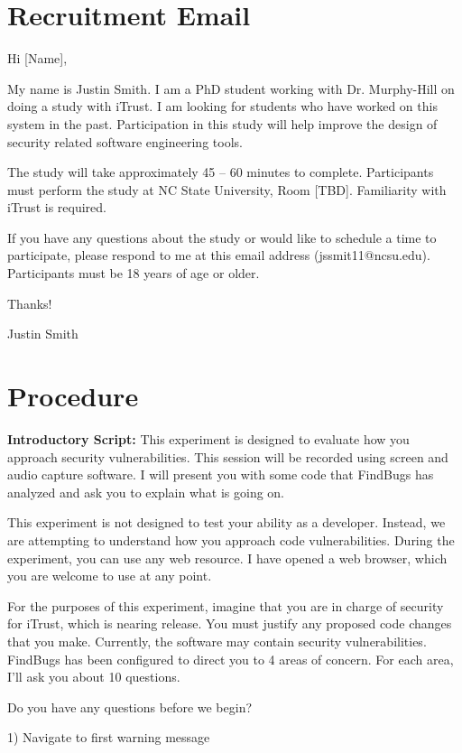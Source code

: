 \documentclass[10pt,journal,compsoc]{IEEEtran}
\begin{document}
\appendices
\section{Recruitment Email}
Hi [Name],

My name is Justin Smith. I am a PhD student working with Dr. Murphy-Hill on doing a study with iTrust.
I am looking for students who have worked on this system in the past. Participation in this study will help
improve the design of security related software engineering tools.

The study will take approximately 45 -- 60 minutes to complete. Participants must perform the study at
NC State University, Room [TBD]. Familiarity with iTrust is required.

If you have any questions about the study or would like to schedule a time to participate, please respond
to me at this email address (jssmit11@ncsu.edu).
Participants must be 18 years of age or older.

\noindent Thanks!

\noindent Justin Smith 

\section{Procedure}

\textbf{Introductory Script:} This experiment is designed to evaluate how you approach security vulnerabilities. This session
will be recorded using screen and audio capture software. I will present you with some code that
FindBugs has analyzed and ask you to explain what is going on.

This experiment is not designed to test your ability as a developer. Instead, we are attempting to
understand how you approach code vulnerabilities. During the experiment, you can use any web
resource. I have opened a web browser, which you are welcome to use at any point.

For the purposes of this experiment, imagine that you are in charge of security for iTrust, which
is nearing release. You must justify any proposed code changes that you make. Currently, the
software may contain security vulnerabilities. FindBugs has been configured to direct you to 4
areas of concern. For each area, I’ll ask you about 10 questions.

Do you have any questions before we begin?

1) Navigate to first warning message
\end{document}
